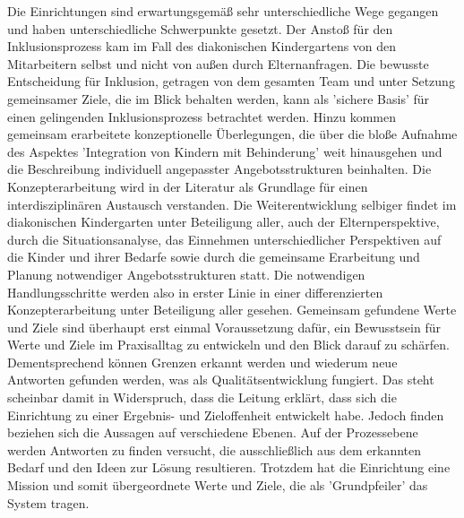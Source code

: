 Die Einrichtungen sind erwartungsgemäß sehr unterschiedliche Wege gegangen und haben unterschiedliche Schwerpunkte gesetzt.
Der Anstoß für den Inklusionsprozess kam im Fall des diakonischen Kindergartens von den Mitarbeitern selbst und nicht von außen durch Elternanfragen. Die bewusste Entscheidung für Inklusion, getragen von dem gesamten Team und unter Setzung gemeinsamer Ziele, die im Blick behalten werden, kann als 'sichere Basis' für einen gelingenden Inklusionsprozess betrachtet werden. Hinzu kommen gemeinsam erarbeitete konzeptionelle Überlegungen, die über die bloße Aufnahme des Aspektes 'Integration von Kindern mit Behinderung' weit hinausgehen und die Beschreibung individuell angepasster Angebotsstrukturen beinhalten. 
Die Konzepterarbeitung wird in der Literatur als Grundlage für einen interdisziplinären Austausch verstanden. Die Weiterentwicklung selbiger findet im diakonischen Kindergarten unter Beteiligung aller, auch der Elternperspektive, durch die Situationsanalyse, das Einnehmen unterschiedlicher Perspektiven auf die Kinder und ihrer Bedarfe sowie durch die gemeinsame Erarbeitung und Planung notwendiger Angebotsstrukturen statt. Die notwendigen Handlungsschritte werden also in erster Linie in einer differenzierten Konzepterarbeitung unter Beteiligung aller gesehen. Gemeinsam gefundene Werte und Ziele sind überhaupt erst einmal Voraussetzung dafür, ein Bewusstsein für Werte und Ziele im Praxisalltag zu entwickeln und den Blick darauf zu schärfen. Dementsprechend können Grenzen erkannt werden und wiederum neue Antworten gefunden werden, was als Qualitätsentwicklung fungiert.
Das steht scheinbar damit in Widerspruch, dass die Leitung erklärt, dass sich die Einrichtung zu einer Ergebnis- und Zieloffenheit entwickelt habe. Jedoch finden beziehen sich die Aussagen auf verschiedene Ebenen. Auf der Prozessebene werden Antworten zu finden versucht, die ausschließlich aus dem erkannten Bedarf und den Ideen zur Lösung resultieren. Trotzdem hat die Einrichtung eine Mission und  somit übergeordnete Werte und Ziele, die als 'Grundpfeiler' das System tragen. 

